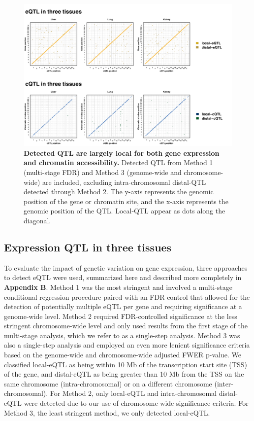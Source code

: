 \begin{figure}[h]
\renewcommand{\familydefault}{\sfdefault}\normalfont
\centering
\includegraphics[width=\textwidth, trim={0in 0in 0in 0in}, clip]{figs/qtl_map_main.pdf}
\caption{\textbf{Detected QTL are largely local for both gene expression and chromatin accessibility.} Detected QTL from Method 1 (multi-stage FDR) and Method 3 (genome-wide and chromosome-wide) are included, excluding intra-chromosomal distal-QTL detected through Method 2. The y-axis represents the genomic position of the gene or chromatin site, and the x-axis represents the genomic position of the QTL. Local-QTL appear as dots along the diagonal.
\label{fig:grid_plot}}
\end{figure}

\subsection{Expression QTL in three tissues}

To evaluate the impact of genetic variation on gene expression, three approaches to detect eQTL were used, summarized here and described more completely in \textbf{Appendix B}. Method 1 was the most stringent and involved a multi-stage conditional regression procedure paired with an FDR control that allowed for the detection of potentially multiple eQTL per gene and requiring significance at a genome-wide level. Method 2 required FDR-controlled significance at the less stringent chromosome-wide level and only used results from the first stage of the multi-stage analysis, which we refer to as a single-step analysis. Method 3 was also a single-step analysis and employed an even more lenient significance criteria based on the genome-wide and chromosome-wide adjusted FWER p-value. We classified local-eQTL as being within 10 Mb of the transcription start site (TSS) of the gene, and distal-eQTL as being greater than 10 Mb from the TSS on the same chromosome (intra-chromosomal) or on a different chromosome (inter-chromosomal). For Method 2, only local-eQTL and intra-chromosomal distal-eQTL were detected due to our use of chromosome-wide significance criteria. For Method 3, the least stringent method, we only detected local-eQTL.

